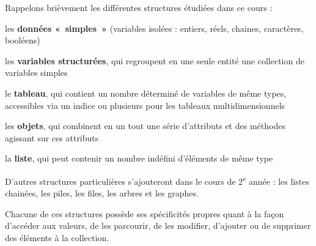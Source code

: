 Rappelons brièvement les différentes structures étudiées dans ce cours
 :

\begin{liste}
	\item 
		les \textbf{données «~simples~»} (variables isolées : entiers, réels,
		chaines, caractères, booléens)
	\item 
		les \textbf{variables structurées}, qui regroupent en une seule entité
		une collection de variables simples
	\item 
		le \textbf{tableau}, qui contient un nombre déterminé de variables de
		même types, accessibles via un indice ou plusieurs pour les tableaux
		multidimensionnels
	\item 
		les \textbf{objets}, qui combinent en un tout une série d’attributs et
		des méthodes agissant sur ces attributs
	\item 
		la \textbf{liste}, qui peut contenir un nombre indéfini d’éléments de
		même type
\end{liste}

D’autres structures particulières s’ajouteront dans le cours de
2\textsuperscript{e} année : les listes chainées, les piles, les
files, les arbres et les graphes.

Chacune de ces structures possède ses spécificités propres quant à la
façon d’accéder aux valeurs, de les parcourir, de les modifier,
d’ajouter ou de supprimer des éléments à la collection. 




